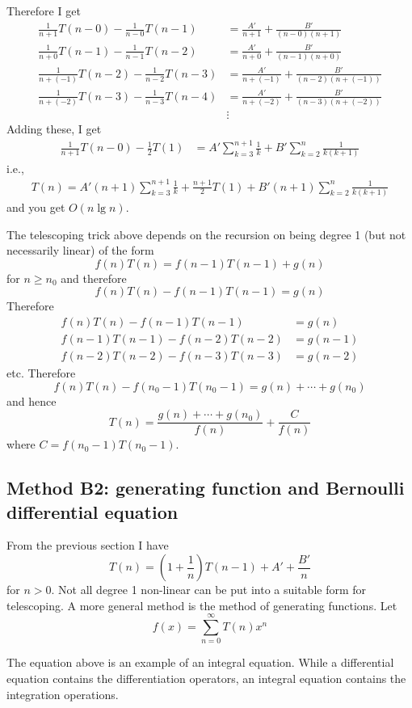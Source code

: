 Therefore I get
\begin{align*}
  \frac{1}{n + 1}T(n - 0) - \frac{1}{n - 0}  T(n - 1) &= \frac{A'}{n + 1} + \frac{B'}{(n-0)(n + 1)} \\
  \frac{1}{n + 0}T(n-1)   - \frac{1}{n - 1}  T(n - 2) &= \frac{A'}{n + 0} + \frac{B'}{(n-1)(n + 0)} \\
  \frac{1}{n + (-1)}T(n-2)  - \frac{1}{n - 2}  T(n - 3) &= \frac{A'}{n + (-1)} + \frac{B'}{(n-2)(n + (-1))} \\
  \frac{1}{n + (-2)}T(n-3)  - \frac{1}{n - 3}  T(n - 4) &= \frac{A'}{n + (-2)} + \frac{B'}{(n-3)(n + (-2))} \\
  &\vdots
\end{align*}
Adding these, I get
\begin{align*}
  \frac{1}{n + 1}T(n - 0) - \frac{1}{2}  T(1) &= A' \sum_{k=3}^{n+1} \frac{1}{k}
                                                + B' \sum_{k=2}^n \frac{1}{k(k+1)}
\end{align*}
i.e.,
\begin{align*}
  T(n)
  =
  A'(n+1)\sum_{k=3}^{n+1} \frac{1}{k}
  + \frac{n+1}{2}  T(1) + B' (n+1)\sum_{k=2}^n \frac{1}{k(k+1)}
\end{align*}
and you get $O(n \lg n)$.

The telescoping trick above depends on the recursion on being degree 1 (but not necessarily
linear) of the form
\[
  f(n) T(n) = f(n - 1) T(n - 1) + g(n)
\]
for $n \geq n_0$ 
and therefore
\[
  f(n) T(n) - f(n - 1) T(n - 1) = g(n)
\]
Therefore
\begin{align*}
  f(n) T(n) - f(n - 1) T(n - 1) &= g(n) \\
  f(n-1) T(n-1) - f(n - 2) T(n - 2) &= g(n-1) \\
  f(n-2) T(n-2) - f(n - 3) T(n - 3) &= g(n-2) 
\end{align*}
etc.
Therefore
\[
  f(n) T(n) - f(n_0 - 1) T(n_0 - 1) = g(n) + \cdots + g(n_0)
\]
and hence
\[
  T(n) = \frac{g(n) + \cdots + g(n_0)}{f(n)} + \frac{C}{f(n)}
\]
where $C = f(n_0 - 1) T(n_0 - 1)$.


\subsection{Method B2: generating function and Bernoulli differential equation}

From the previous section I have
\[
  T(n)
  = \left( 1 + \frac{1}{n} \right) T(n - 1) + A' + \frac{B'}{n}
\]
for $n > 0$.
Not all degree 1 non-linear can be put into a suitable form
for telescoping.
A more general method is the method of generating functions.
Let
\[
  f(x) = \sum_{n = 0}^\infty T(n) x^n
\]



The equation above is an example of an integral equation.
While a differential equation contains the differentiation operators,
an integral equation contains the integration operations.




